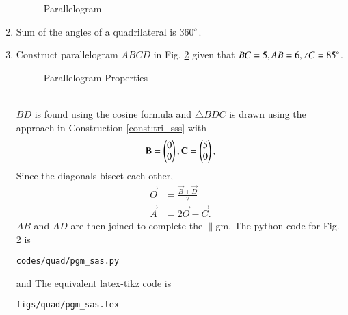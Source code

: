 \begin{enumerate}[label=\arabic*.,ref=\thesubsection.\theenumi]
%
\begin{figure}[!ht]
	\begin{center}
		\resizebox{\columnwidth}{!}{}
	\end{center}
	\caption{Parallelogram}
	\label{fig:tri_med_pgm}	
\end{figure}
%
\item Sum of the angles of a quadrilateral is 360$\degree$. 
%
\item Construct parallelogram $ABCD$ 	in Fig. \ref{fig:pgm_sas}	
given that  $BC = 5, AB = 6, \angle C = 85 \degree$.
\begin{figure}[!ht]
	\begin{center}
		\resizebox{\columnwidth}{!}{}
	\end{center}
	\caption{Parallelogram Properties}
	\label{fig:pgm_sas}	
\end{figure}
%
\\
\solution $BD$ is found using the cosine formula and $\triangle BDC$ is drawn using the approach in Construction \ref{const:tri_sss} with 
%
\begin{align}
\mathbf{B} = \begin{pmatrix}0\\0\end{pmatrix},
\mathbf{C} = \begin{pmatrix}5\\0\end{pmatrix},
\end{align}
%
Since the diagonals bisect each other, 
%
\begin{align}
\vec{O} &= \frac{\vec{B}+\vec{D}}{2}
\\
\vec{A} &= 2\vec{O} - \vec{C}.
\end{align}
%
$AB$ and $AD$ are then joined to complete the $\parallel$gm.
The python code for  Fig. \ref{fig:pgm_sas} is
\begin{lstlisting}
codes/quad/pgm_sas.py
\end{lstlisting}
%
and 
The equivalent latex-tikz code is
%
\begin{lstlisting}
figs/quad/pgm_sas.tex
\end{lstlisting}
%


\end{enumerate}
